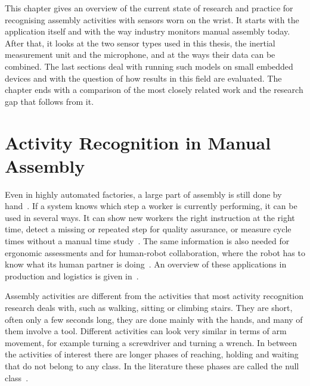
\label{ch:background}


This chapter gives an overview of the current state of research and practice
for recognising assembly activities with sensors worn on the wrist. It starts
with the application itself and with the way industry monitors manual assembly
today. After that, it looks at the two sensor types used in this thesis, the
inertial measurement unit and the microphone, and at the ways their data can be
combined. The last sections deal with running such models on small embedded
devices and with the question of how results in this field are evaluated. The
chapter ends with a comparison of the most closely related work and the
research gap that follows from it.

\section{Activity Recognition in Manual Assembly}
\label{sec:sota-assembly}

Even in highly automated factories, a large part of assembly is still done by
hand~\cite{alamin2019action}. If a system knows which step a worker is
currently performing, it can be used in several ways. It can show new workers
the right instruction at the right time, detect a missing or repeated step for
quality assurance, or measure cycle times without a manual time
study~\cite{stiefmeier2008wearable, alamin2019action}. The same information is
also needed for ergonomic assessments and for human-robot collaboration, where
the robot has to know what its human partner is doing~\cite{berg2018action}.
An overview of these applications in production and logistics is given
in~\cite{reining2019har}.

Assembly activities are different from the activities that most activity
recognition research deals with, such as walking, sitting or climbing stairs.
They are short, often only a few seconds long, they are done mainly with the
hands, and many of them involve a tool. Different activities can look very
similar in terms of arm movement, for example turning a screwdriver and turning
a wrench. In between the activities of interest there are longer phases of
reaching, holding and waiting that do not belong to any class. In the
literature these phases are called the null class~\cite{bulling2014tutorial}.

